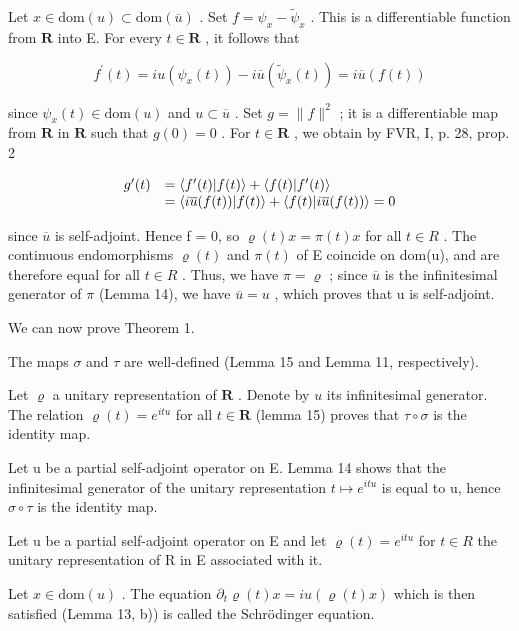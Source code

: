 Let \(x \in \text{dom}(u) \subset \text{dom}(\overline{u})\) . Set \(f = \psi_x - \widetilde{\psi}_x\) . This is a differentiable function from \(\mathbf{R}\) into E. For every \(t \in \mathbf{R}\) , it follows that

\[
f ^ {\prime} (t) = i u (\psi_ {x} (t)) - i \overline {{u}} (\widetilde {\psi} _ {x} (t)) = i \overline {{u}} (f (t))
\]

since \(\psi_x(t) \in \mathrm{dom}(u)\) and \(u \subset \overline{u}\) . Set \(g = \|f\|^2\) ; it is a differentiable map from \(\mathbf{R}\) in \(\mathbf{R}\) such that \(g(0) = 0\) . For \(t \in \mathbf{R}\) , we obtain by FVR, I, p. 28, prop. 2

\[
\begin{array}{r l} g ^ {\prime} (t) & = \langle f ^ {\prime} (t) | f (t) \rangle + \langle f (t) | f ^ {\prime} (t) \rangle \\ & = \langle i \overline {{u}} (f (t)) | f (t) \rangle + \langle f (t) | i \overline {{u}} (f (t)) \rangle = 0 \end{array}
\]

since \(\overline{u}\) is self-adjoint. Hence f = 0, so \(\varrho(t)x = \pi(t)x\) for all \(t \in R\) . The continuous endomorphisms \(\varrho(t)\) and \(\pi(t)\) of E coincide on dom(u), and are therefore equal for all \(t \in R\) . Thus, we have \(\pi = \varrho\) ; since \(\overline{u}\) is the infinitesimal generator of \(\pi\) (Lemma 14), we have \(\overline{u} = u\) , which proves that u is self-adjoint.

We can now prove Theorem 1.

The maps \(\sigma\) and \(\tau\) are well-defined (Lemma 15 and Lemma 11, respectively).

Let \(\varrho\) a unitary representation of \(\mathbf{R}\) . Denote by \(u\) its infinitesimal generator. The relation \(\varrho(t) = e^{itu}\) for all \(t \in \mathbf{R}\) (lemma 15) proves that \(\tau \circ \sigma\) is the identity map.

Let u be a partial self-adjoint operator on E. Lemma 14 shows that the infinitesimal generator of the unitary representation \(t \mapsto e^{itu}\) is equal to u, hence \(\sigma \circ \tau\) is the identity map.

Let u be a partial self-adjoint operator on E and let \(\varrho(t) = e^{itu}\) for \(t \in R\) the unitary representation of R in E associated with it.

Let \(x \in \text{dom}(u)\) . The equation \(\partial_{t} \varrho(t)x = i u(\varrho(t)x)\) which is then satisfied (Lemma 13, b)) is called the Schrödinger equation.

